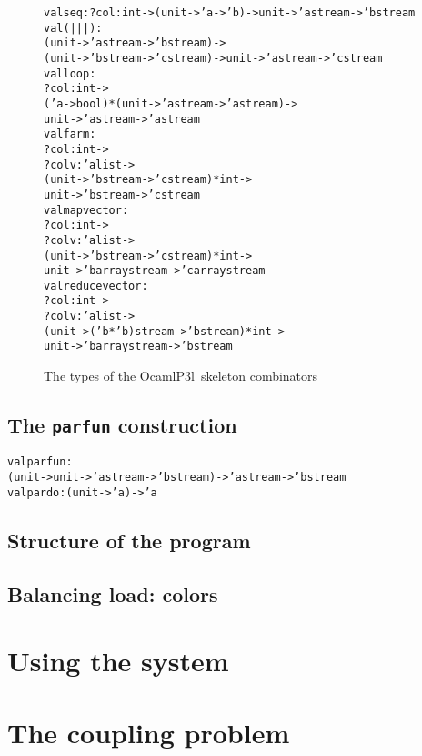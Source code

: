 \documentclass{article}
\newcommand{\ocamlpiiil}{{\sf OcamlP3l}}
\begin{document}
\begin{figure}[htbf]
\begin{alltt}
val seq : ?col:int -> (unit -> 'a -> 'b) -> unit -> 'a stream -> 'b stream
val ( ||| ) :
  (unit -> 'a stream -> 'b stream) ->
  (unit -> 'b stream -> 'c stream) -> unit -> 'a stream -> 'c stream
val loop :
  ?col:int ->
  ('a -> bool) * (unit -> 'a stream -> 'a stream) ->
  unit -> 'a stream -> 'a stream
val farm :
  ?col:int ->
  ?colv:'a list ->
  (unit -> 'b stream -> 'c stream) * int ->
  unit -> 'b stream -> 'c stream
val mapvector :
  ?col:int ->
  ?colv:'a list ->
  (unit -> 'b stream -> 'c stream) * int ->
  unit -> 'b array stream -> 'c array stream
val reducevector :
  ?col:int ->
  ?colv:'a list ->
  (unit -> ('b * 'b) stream -> 'b stream) * int ->
  unit -> 'b array stream -> 'b stream
\end{alltt}
\caption{The types of the \ocamlpiiil\ skeleton combinators }
\end{figure}

\subsection{ The  {\tt parfun} construction }

\begin{alltt}
val parfun :
  (unit -> unit -> 'a stream -> 'b stream) -> 'a stream -> 'b stream
val pardo : (unit -> 'a) -> 'a
\end{alltt}

\subsection{ Structure of the program }\label{f11}
\subsection{ Balancing load: colors }

\section{Using the system}


%
%
\section{The coupling problem}
%
\end{document}
